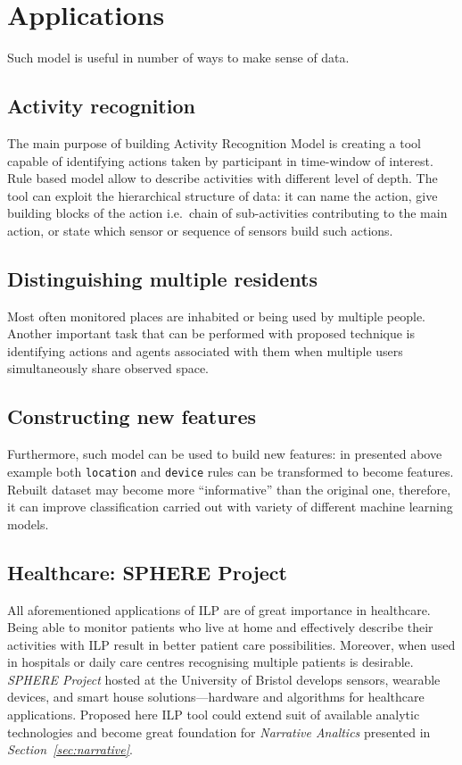 \documentclass[12pt, a4paper, pdflatex, leqno, twoside]{report}
\begin{document}
\section{Applications}
Such model is useful in number of ways to make sense of data.

  \subsection{Activity recognition}
The main purpose of building Activity Recognition Model is creating a tool capable of identifying actions taken by participant in time-window of interest. Rule based model allow to describe activities with different level of depth. The tool can exploit the hierarchical structure of data: it can name the action, give building blocks of the action i.e.\ chain of sub-activities contributing to the main action, or state which sensor or sequence of sensors build such actions.
    
  \subsection{Distinguishing multiple residents}
Most often monitored places are inhabited or being used by multiple people. Another important task that can be performed with proposed technique is identifying actions and agents associated with them when multiple users simultaneously share observed space.
  
  \subsection{Constructing new features}
Furthermore, such model can be used to build new features: in presented above example both \texttt{location} and \texttt{device} rules can be transformed to become features. Rebuilt dataset may become more ``informative'' than the original one, therefore, it can improve classification carried out with variety of different machine learning models.

  \subsection{Healthcare: SPHERE Project}
All aforementioned applications of ILP are of great importance in healthcare. Being able to monitor patients who live at home and effectively describe their activities with ILP result in better patient care possibilities. Moreover, when used in hospitals or daily care centres recognising multiple patients is desirable.\\
\emph{SPHERE Project} hosted at the University of Bristol develops sensors, wearable devices, and smart house solutions---hardware and algorithms for healthcare applications. Proposed here ILP tool could extend suit of available analytic technologies and become great foundation for \emph{Narrative Analtics} presented in \emph{Section~\ref{sec:narrative}}.
\end{document}
